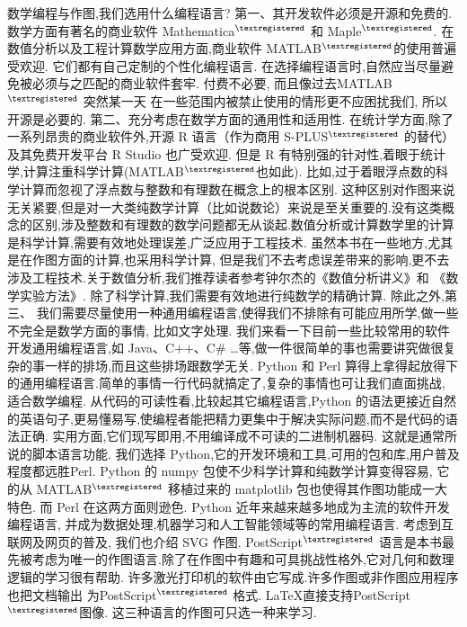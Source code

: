 数学编程与作图,我们选用什么编程语言?
第一、其开发软件必须是开源和免费的.
数学方面有著名的商业软件 Mathematica${}^{\textregistered}$ 和 Maple${}^{\textregistered}$.
在数值分析以及工程计算数学应用方面,商业软件 MATLAB${}^{\textregistered}$的使用普遍受欢迎.
它们都有自己定制的个性化编程语言.
在选择编程语言时,自然应当尽量避免被必须与之匹配的商业软件套牢.
付费不必要, 而且像过去MATLAB${}^{\textregistered}$ 突然某一天
在一些范围内被禁止使用的情形更不应困扰我们, 所以开源是必要的.
第二、充分考虑在数学方面的通用性和适用性.
在统计学方面,除了一系列昂贵的商业软件外,开源 R 语言（作为商用 S-PLUS${}^{\textregistered}$ 的替代）及其免费开发平台 R Studio 也广受欢迎.
但是 R 有特别强的针对性,着眼于统计学,计算注重科学计算(MATLAB${}^{\textregistered}$也如此).
比如,过于着眼浮点数的科学计算而忽视了浮点数与整数和有理数在概念上的根本区别.
这种区别对作图来说无关紧要,但是对一大类纯数学计算（比如说数论）来说是至关重要的.没有这类概念的区别,涉及整数和有理数的数学问题都无从谈起.数值分析或计算数学里的计算是科学计算,需要有效地处理误差,广泛应用于工程技术.
虽然本书在一些地方,尤其是在作图方面的计算,也采用科学计算,
但是我们不去考虑误差带来的影响,更不去涉及工程技术.关于数值分析,我们推荐读者参考钟尔杰的《数值分析讲义》\cite{ZhongEr1}和
《数学实验方法》\cite{ZhongEr2}.
除了科学计算,我们需要有效地进行纯数学的精确计算.
除此之外,第三、
我们需要尽量使用一种通用编程语言,使得我们不排除有可能应用所学,做一些不完全是数学方面的事情, 比如文字处理.
我们来看一下目前一些比较常用的软件开发通用编程语言,如 Java、C++、C\# …等,做一件很简单的事也需要讲究做很复杂的事一样的排场,而且这些排场跟数学无关. 
Python 和 Perl 算得上拿得起放得下的通用编程语言.简单的事情一行代码就搞定了,复杂的事情也可让我们直面挑战, 适合数学编程.
从代码的可读性看,比较起其它编程语言,Python 的语法更接近自然的英语句子,更易懂易写,使编程者能把精力更集中于解决实际问题,而不是代码的语法正确.
实用方面,它们现写即用,不用编译成不可读的二进制机器码.
这就是通常所说的脚本语言功能.
我们选择 Python,它的开发环境和工具,可用的包和库,用户普及程度都远胜Perl. Python 的 numpy 包使不少科学计算和纯数学计算变得容易, 它的从 MATLAB${}^{\textregistered}$ 移植过来的 matplotlib 包也使得其作图功能成一大特色. 而 Perl 在这两方面则逊色. 
Python 近年来越来越多地成为主流的软件开发编程语言,
并成为数据处理,机器学习和人工智能领域等的常用编程语言.
考虑到互联网及网页的普及, 我们也介绍 SVG 作图. PostScript${}^{\textregistered}$ 语言是本书最先被考虑为唯一的作图语言.除了在作图中有趣和可具挑战性格外,它对几何和数理逻辑的学习很有帮助.
许多激光打印机的软件由它写成.许多作图或非作图应用程序也把文档输出
为PostScript${}^{\textregistered}$ 格式. \LaTeX 直接支持PostScript${}^{\textregistered}$图像.
这三种语言的作图可只选一种来学习.

